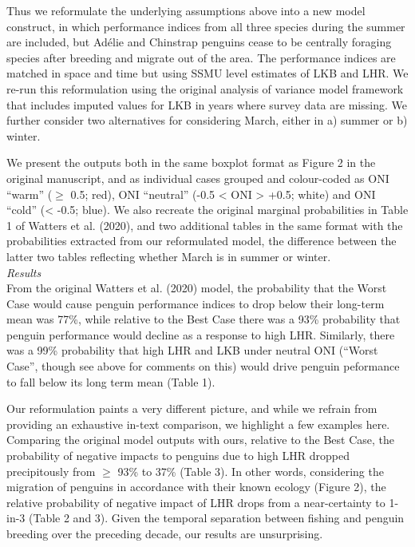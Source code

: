\documentclass[]{elsarticle} %
\begin{document}
Thus we reformulate the underlying assumptions above into a new model
construct, in which performance indices from all three species during
the summer are included, but Adélie and Chinstrap penguins cease to be
centrally foraging species after breeding and migrate out of the area.
The performance indices are matched in space and time but using SSMU
level estimates of LKB and LHR. We re-run this reformulation using the
original analysis of variance model framework that includes imputed
values for LKB in years where survey data are missing. We further
consider two alternatives for considering March, either in a) summer or
b) winter.

We present the outputs both in the same boxplot format as Figure 2 in
the original manuscript, and as individual cases grouped and
colour-coded as ONI ``warm'' (\(\geqslant\) 0.5; red), ONI ``neutral''
(-0.5 \textless{} ONI \textgreater{} +0.5; white) and ONI ``cold''
(\textless{} -0.5; blue). We also recreate the original marginal
probabilities in Table 1 of Watters et al. (2020), and two additional
tables in the same format with the probabilities extracted from our
reformulated model, the difference between the latter two tables
reflecting whether March is in summer or winter.\\
\newline   \emph{Results}\\
From the original Watters et al. (2020) model, the probability that the
Worst Case would cause penguin performance indices to drop below their
long-term mean was 77\%, while relative to the Best Case there was a
93\% probability that penguin performance would decline as a response to
high LHR. Similarly, there was a 99\% probability that high LHR and LKB
under neutral ONI (``Worst Case'', though see above for comments on
this) would drive penguin peformance to fall below its long term mean
(Table 1).

Our reformulation paints a very different picture, and while we refrain
from providing an exhaustive in-text comparison, we highlight a few
examples here. Comparing the original model outputs with ours, relative
to the Best Case, the probability of negative impacts to penguins due to
high LHR dropped precipitously from \(\geqslant\) 93\% to 37\% (Table
3). In other words, considering the migration of penguins in accordance
with their known ecology (Figure 2), the relative probability of
negative impact of LHR drops from a near-certainty to 1-in-3 (Table 2
and 3). Given the temporal separation between fishing and penguin
breeding over the preceding decade, our results are unsurprising.
\end{document}
